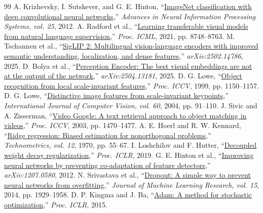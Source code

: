 \begin{thebibliography}{99}
 A. Krizhevsky, I. Sutskever, and G. E. Hinton, ``\href{https://papers.nips.cc/paper_files/paper/2012/hash/c399862d3b9d6b76c8436e924a68c45b-Abstract.html}{ImageNet classification with deep convolutional neural networks},'' \emph{Advances in Neural Information Processing Systems, vol. 25}, 2012.
 A. Radford et al., ``\href{https://proceedings.mlr.press/v139/radford21a.html}{Learning transferable visual models from natural language supervision},'' \emph{Proc. ICML}, 2021, pp. 8748--8763.
 M. Tschannen et al., ``\href{https://arxiv.org/abs/2502.14786}{SigLIP 2: Multilingual vision-language encoders with improved semantic understanding, localization, and dense features},'' \emph{arXiv:2502.14786}, 2025.
 D. Bolya et al., ``\href{https://arxiv.org/abs/2504.13181}{Perception Encoder: The best visual embeddings are not at the output of the network},'' \emph{arXiv:2504.13181}, 2025.
 D. G. Lowe, ``\href{https://www.cs.ubc.ca/~lowe/papers/iccv99.pdf}{Object recognition from local scale-invariant features},'' \emph{Proc. ICCV}, 1999, pp. 1150--1157.
 D. G. Lowe, ``\href{https://www.cs.ubc.ca/~lowe/papers/ijcv04.pdf}{Distinctive image features from scale-invariant keypoints},'' \emph{International Journal of Computer Vision, vol. 60}, 2004, pp. 91--110.
 J. Sivic and A. Zisserman, ``\href{https://www.robots.ox.ac.uk/~vgg/publications/2003/Sivic03/}{Video Google: A text retrieval approach to object matching in videos},'' \emph{Proc. ICCV}, 2003, pp. 1470--1477.
 A. E. Hoerl and R. W. Kennard, ``\href{https://doi.org/10.1080/00401706.1970.10488634}{Ridge regression: Biased estimation for nonorthogonal problems},'' \emph{Technometrics, vol. 12}, 1970, pp. 55--67.
 I. Loshchilov and F. Hutter, ``\href{https://arxiv.org/abs/1711.05101}{Decoupled weight decay regularization},'' \emph{Proc. ICLR}, 2019.
 G. E. Hinton et al., ``\href{https://arxiv.org/abs/1207.0580}{Improving neural networks by preventing co-adaptation of feature detectors},'' \emph{arXiv:1207.0580}, 2012.
 N. Srivastava et al., ``\href{https://jmlr.org/papers/v15/srivastava14a.html}{Dropout: A simple way to prevent neural networks from overfitting},'' \emph{Journal of Machine Learning Research, vol. 15}, 2014, pp. 1929--1958.
 D. P. Kingma and J. Ba, ``\href{https://arxiv.org/abs/1412.6980}{Adam: A method for stochastic optimization},'' \emph{Proc. ICLR}, 2015.

\end{thebibliography}
